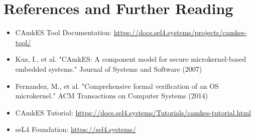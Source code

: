 \documentclass[12pt,a4paper]{article}
\begin{document}
\section{References and Further Reading}

\begin{itemize}
    \item CAmkES Tool Documentation: \url{https://docs.sel4.systems/projects/camkes-tool/}
    \item Kuz, I., et al. "CAmkES: A component model for secure microkernel-based embedded systems." Journal of Systems and Software (2007)
    \item Fernandez, M., et al. "Comprehensive formal verification of an OS microkernel." ACM Transactions on Computer Systems (2014)
    \item CAmkES Tutorial: \url{https://docs.sel4.systems/Tutorials/camkes-tutorial.html}
    \item seL4 Foundation: \url{https://sel4.systems/}
\end{itemize}
\end{document}

